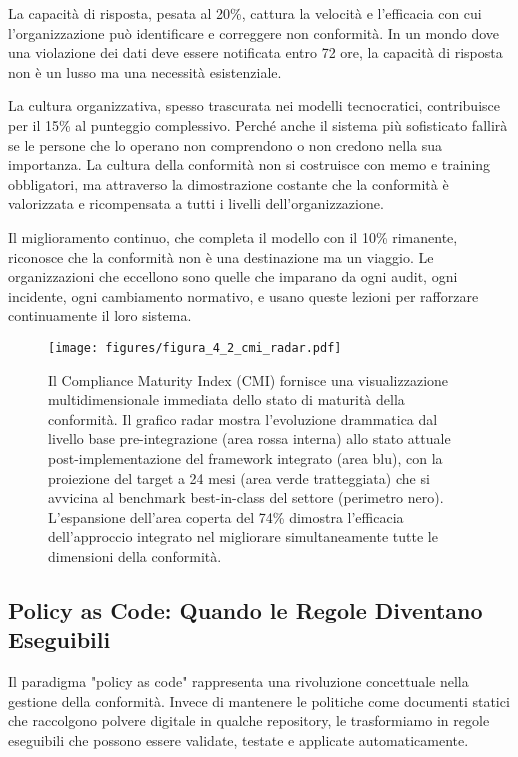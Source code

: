 La capacità di risposta, pesata al 20\%, cattura la velocità e l'efficacia con cui l'organizzazione può identificare e correggere non conformità. In un mondo dove una violazione dei dati deve essere notificata entro 72 ore, la capacità di risposta non è un lusso ma una necessità esistenziale.

La cultura organizzativa, spesso trascurata nei modelli tecnocratici, contribuisce per il 15\% al punteggio complessivo. Perché anche il sistema più sofisticato fallirà se le persone che lo operano non comprendono o non credono nella sua importanza. La cultura della conformità non si costruisce con memo e training obbligatori, ma attraverso la dimostrazione costante che la conformità è valorizzata e ricompensata a tutti i livelli dell'organizzazione.

Il miglioramento continuo, che completa il modello con il 10\% rimanente, riconosce che la conformità non è una destinazione ma un viaggio. Le organizzazioni che eccellono sono quelle che imparano da ogni audit, ogni incidente, ogni cambiamento normativo, e usano queste lezioni per rafforzare continuamente il loro sistema.

\begin{figure}[htbp]
\centering
\texttt{[image: figures/figura\_4\_2\_cmi\_radar.pdf]}
\caption{Il Compliance Maturity Index (CMI) fornisce una visualizzazione multidimensionale immediata dello stato di maturità della conformità. Il grafico radar mostra l'evoluzione drammatica dal livello base pre-integrazione (area rossa interna) allo stato attuale post-implementazione del framework integrato (area blu), con la proiezione del target a 24 mesi (area verde tratteggiata) che si avvicina al benchmark best-in-class del settore (perimetro nero). L'espansione dell'area coperta del 74\% dimostra l'efficacia dell'approccio integrato nel migliorare simultaneamente tutte le dimensioni della conformità.}
\label{fig:cmi_radar}
\end{figure}

\subsection{Policy as Code: Quando le Regole Diventano Eseguibili}

Il paradigma "policy as code" rappresenta una rivoluzione concettuale nella gestione della conformità. Invece di mantenere le politiche come documenti statici che raccolgono polvere digitale in qualche repository, le trasformiamo in regole eseguibili che possono essere validate, testate e applicate automaticamente.

